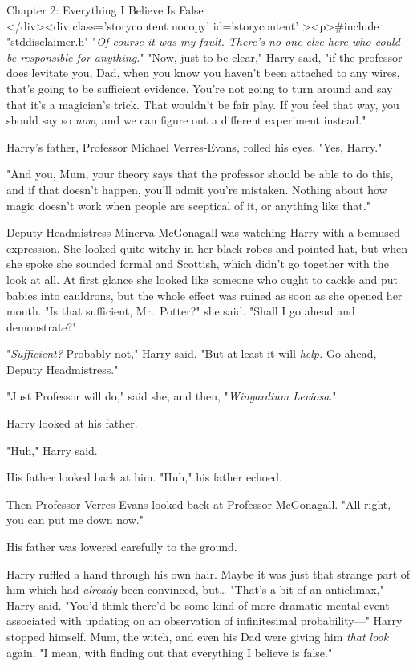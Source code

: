 
Chapter 2: Everything I Believe Is False\\
</div><div  class='storycontent nocopy' id='storycontent' ><p>#include 
"stddisclaimer.h"
\sbreak
"\emph{Of course it was my fault. There's no one else here who could be 
responsible for anything.}"
\sbreak
"Now, just to be clear," Harry said, "if the professor does levitate you, Dad, 
when you know you haven't been attached to any wires, that's going to be 
sufficient evidence. You're not going to turn around and say that it's a 
magician's trick. That wouldn't be fair play. If you feel that way, you should 
say so \emph{now}, and we can figure out a different experiment instead."

Harry's father, Professor Michael Verres-Evans, rolled his eyes. "Yes, Harry."

"And you, Mum, your theory says that the professor should be able to do this, 
and if that doesn't happen, you'll admit you're mistaken. Nothing about how 
magic doesn't work when people are sceptical of it, or anything like that."

Deputy Headmistress Minerva McGonagall was watching Harry with a bemused 
expression. She looked quite witchy in her black robes and pointed hat, but 
when she spoke she sounded formal and Scottish, which didn't go together with 
the look at all. At first glance she looked like someone who ought to cackle 
and put babies into cauldrons, but the whole effect was ruined as soon as she 
opened her mouth. "Is that sufficient, Mr.~Potter?" she said. "Shall I go ahead 
and demonstrate?"

"\emph{Sufficient?} Probably not," Harry said. "But at least it will 
\emph{help.} Go ahead, Deputy Headmistress."

"Just Professor will do," said she, and then, "\emph{Wingardium Leviosa}."

Harry looked at his father.

"Huh," Harry said.

His father looked back at him. "Huh," his father echoed.

Then Professor Verres-Evans looked back at Professor McGonagall. "All right, 
you can put me down now."

His father was lowered carefully to the ground.

Harry ruffled a hand through his own hair. Maybe it was just that strange part 
of him which had \emph{already} been convinced, but{\ldots} "That's a bit of an 
anticlimax," Harry said. "You'd think there'd be some kind of more dramatic 
mental event associated with updating on an observation of infinitesimal 
probability---" Harry stopped himself. Mum, the witch, and even his Dad were 
giving him \emph{that look} again. "I mean, with finding out that everything I 
believe is false."

